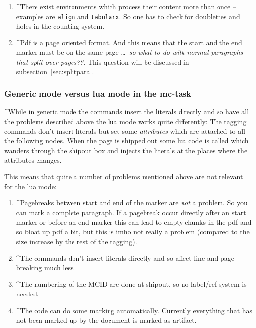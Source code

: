 \documentclass[DIV=12,parskip=half-,bibliography=totoc]{scrartcl}
\begin{document}
\begin{enumerate}[beginpenalty=10000]
  \item
  \TagP^There exist environments which process their content more than once -- examples are \texttt{align} and \texttt{tabularx}.
       So one has to check for doublettes and holes in the counting system.\Pmeti


  \item
  \TagP^Pdf is a page oriented format. And this means that the start and the end marker must be on the same page \ldots\ \emph{so what to do with normal paragraphs that split over pages??}. This question will be discussed in subsection~\ref{sec:splitpara}.\Pmeti
\end{enumerate}

\subsubsection{Generic mode versus lua mode in the mc-task}

\TagP^While in generic mode the commands insert the literals directly and so have all the problems described above the lua mode works quite differently: The tagging commands don't insert literals but set some \emph{attributes} which are attached to all the following nodes. When the page is shipped out some lua code is called which wanders through the shipout box and injects the literals at the places where the attributes changes.

\TagP This means that quite a number of problems mentioned above are not relevant for the lua mode:\TagPend

\begin{enumerate}
\item \TagP^Pagebreaks between start and end of the marker are \emph{not} a problem. So you can mark a complete paragraph. If a pagebreak occur directly after an start marker or before an end marker this can lead to empty chunks in the pdf and so bloat up pdf a bit, but this is imho not really a problem (compared to the size increase by the rest of the tagging).\Pmeti
\item \TagP^The commands don't insert literals directly and so affect line and page breaking much less.\Pmeti
\item \TagP^The numbering of the MCID are done at shipout, so no label/ref system is needed.\Pmeti
\item \TagP^The code can do some marking automatically. Currently everything that has not been marked up by the document is marked as artifact.\Pmeti
\end{enumerate}
\end{document}
